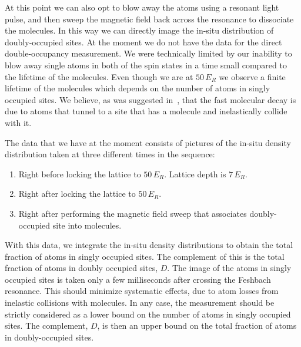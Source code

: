 \documentclass[11pt,letter]{article}
\begin{document}
At this point we can also opt to blow away the atoms using a resonant
light pulse, and then sweep the magnetic field back across the resonance
to dissociate the molecules.  In this way we can directly image the
in-situ distribution of doubly-occupied sites.   At the moment we do not
have the data for the direct double-occupancy measurement. We were
technically limited by our inability to blow away single atoms in both
of the spin states in a time small compared to the lifetime of the
molecules.    Even though we are at $50\,E_{R}$ we observe a finite
lifetime of the molecules which depends on the number of atoms in singly
occupied sites.   We believe, as was suggested in~\cite{Thalhammer2006},
that the fast molecular decay is due to atoms that tunnel to a site that
has a molecule and inelastically collide with it.  

The data that we have at the moment consists of pictures of the in-situ density
distribution taken at three different times in the sequence: 
\begin{enumerate}
\item Right before locking the lattice to $50\,E_{R}$.  Lattice depth is
$7\,E_{R}$.  
\item Right after locking the lattice to $50\,E_{R}$.  
\item Right after performing the magnetic field sweep that associates
doubly-occupied site into molecules. 
\end{enumerate}

With this data, we integrate the in-situ density distributions to obtain the
total fraction of atoms in singly occupied sites.  The complement of this is
the total fraction of atoms in doubly occupied sites, $D$.   The image of the
atoms in singly occupied sites is taken only a few milliseconds after crossing
the Feshbach resonance.  This should minimize systematic effects, due to atom
losses from inelastic collisions with molecules.   In any case, the measurement
should be strictly considered as a lower bound on the number of atoms in singly
occupied sites.   The complement, $D$, is then an upper bound on the total
fraction of atoms in doubly-occupied sites. 
\end{document}

